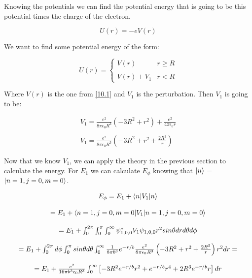 Knowing the potentials we can find the potential energy that is going to be this potential times the charge of the electron.

\begin{equation}
  U(r) = - e V(r)
\end{equation}

We want to find some potential energy of the form:

\begin{equation}
  U(r) = \left\{\begin{array}{cc}
    V(r) & r \geq R
    \\

    \\
    V(r) + V_1 & r < R
  \end{array}
\end{equation}

Where $V(r)$ is the one from \ref{10.1} and $V_1$ is the perturbation. Then $V_1$ is going to be:

\begin{equation}
  \begin{array}{c}
    V_1 = \frac{e^2}{8\pi\epsilon_0 R^3} (-3R^2+r^2) + \frac{e^2}{4\pi \epsilon_0 r}
    \\

    \\
    V_1 = \frac{e^2}{8\pi\epsilon_0 R^3} \left( -3R^2 + r^2 + \frac{2R^3}{r} \right)
  \end{array}
\end{equation}

Now that we know $V_1$, we can apply the theory in the previous section to calculate the energy. For $E_1$ we can calculate $E_{\phi}$ knowing that $\lvert n\rangle$ = $\lvert n=1,j=0,m=0\rangle$.

\begin{equation}
  \begin{array}{c}
    E_{\phi} = E_1 + \langle n\rvert V_1\lvert n\rangle
    \\

    \\
    = E_1 + \langle n=1,j=0,m=0\rvert V_1\lvert n=1,j=0,m=0\rangle
    \\

    \\
    = E_1 + \int_{0}^{2\pi} \int_{0}^{\pi} \int_{0}^{\infty} \psi_{1,0,0}^* V_1 \psi_{1,0,0} r^2 sin\theta dr d\theta d\phi
    \\

    \\
    = E_1 + \int_{0}^{2\pi} d\phi \int_{0}^{\pi} sin\theta d\theta \int_{0}^{\infty} \frac{1}{8\pi b^3} e^{-r/b} \frac{e^2}{8\pi\epsilon_0 R^3}\left(-3R^2+r^2+\frac{2R^3}{r}\right) r^2 dr =
    \\

    \\
    = E_1 + \frac{e^2}{16\pi b^3 \epsilon_0 R^3}  \int_{0}^{\infty} \left[-3R^2e^{-r/b}r^2 + e^{-r/b} r^4 + 2R^3e^{-r/b} r\right] dr
  \end{array}
\end{equation}

